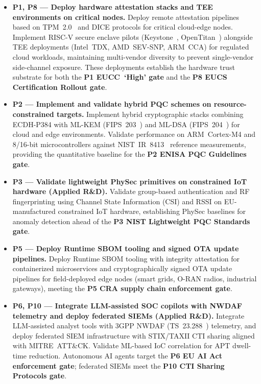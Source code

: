 \documentclass{ieeeaccess}
\begin{document}
\begin{itemize}

    \item \textbf{P1, P8 --- Deploy hardware attestation stacks and
    TEE environments on critical nodes.}
    Deploy remote attestation pipelines based on TPM~2.0~\cite{tpm20}
    and DICE protocols for critical cloud-edge nodes. Implement
    RISC-V secure enclave pilots (Keystone~\cite{keystone},
    OpenTitan~\cite{opentitan}) alongside TEE deployments (Intel~TDX,
    AMD~SEV-SNP, ARM~CCA) for regulated cloud workloads, maintaining
    multi-vendor diversity to prevent single-vendor side-channel
    exposure. These deployments establish the hardware trust substrate
    for both the \textbf{P1 EUCC~`High' gate} and the
    \textbf{P8 EUCS Certification Rollout gate}.

    \item \textbf{P2 --- Implement and validate hybrid PQC schemes on
    resource-constrained targets.}
    Implement hybrid cryptographic stacks combining ECDH-P384 with
    ML-KEM (FIPS~203~\cite{fips203}) and ML-DSA
    (FIPS~204~\cite{fips204}) for cloud and edge environments.
    Validate performance on ARM~Cortex-M4 and 8/16-bit microcontrollers
    against NIST~IR~8413~\cite{nistir8413} reference measurements,
    providing the quantitative baseline for the
    \textbf{P2 ENISA PQC Guidelines gate}.

    \item \textbf{P3 --- Validate lightweight PhySec primitives on
    constrained IoT hardware (Applied R\&D).}
    Validate group-based authentication and RF fingerprinting using
    Channel State Information (CSI) and RSSI on EU-manufactured
    constrained IoT hardware, establishing PhySec baselines for
    anomaly detection ahead of the
    \textbf{P3 NIST Lightweight PQC Standards gate}.

    \item \textbf{P5 --- Deploy Runtime SBOM tooling and signed OTA
    update pipelines.}
    Deploy Runtime SBOM tooling with integrity attestation for
    containerized microservices and cryptographically signed OTA update
    pipelines for field-deployed edge nodes (smart grids, O-RAN radios,
    industrial gateways), meeting the
    \textbf{P5 CRA supply chain enforcement gate}.

    \item \textbf{P6, P10 --- Integrate LLM-assisted SOC copilots with
    NWDAF telemetry and deploy federated SIEMs (Applied R\&D).}
    Integrate LLM-assisted analyst tools with 3GPP NWDAF
    (TS~23.288~\cite{3gpp23288}) telemetry, and deploy federated SIEM
    infrastructure with STIX/TAXII CTI sharing aligned with
    MITRE~ATT\&CK. Validate ML-based IoC correlation for APT
    dwell-time reduction. Autonomous AI agents target the
    \textbf{P6 EU AI Act enforcement gate}; federated SIEMs meet the
    \textbf{P10 CTI Sharing Protocols gate}.


\end{itemize}
\end{document}
